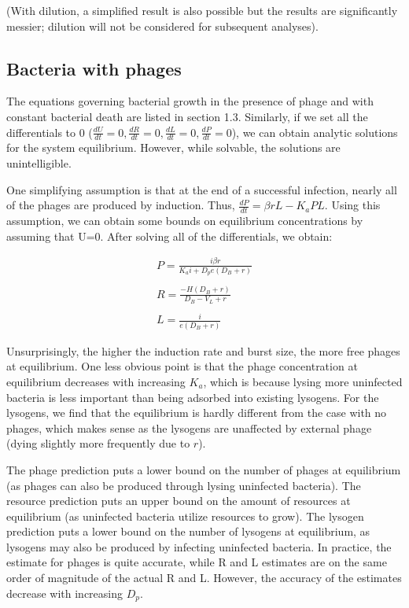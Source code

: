 \documentclass{article}
\begin{document}
(With dilution, a simplified result is also possible but the results are significantly messier; dilution will not be considered for subsequent analyses). 

\subsection{Bacteria with phages}
The equations governing bacterial growth in the presence of phage and with constant bacterial death are listed in section 1.3. Similarly, if we set all the differentials to 0 ($
\frac{dU}{dt} = 0, \frac{dR}{dt} = 0, \frac{dL}{dt} = 0, \frac{dP}{dt} = 0
$), we can obtain analytic solutions for the system equilibrium. However, while solvable, the solutions are unintelligible.  

One simplifying assumption is that at the end of a successful infection, nearly all of the phages are produced by induction. Thus, $\frac{dP}{dt} = \beta r L - K_a P L$. Using this assumption, we can obtain some bounds on equilibrium concentrations by assuming that U=0. After solving all of the differentials, we obtain:

\begin{equation}
\begin{split}
P = \frac{i \beta r }{K_a i + D_p e (D_B+r)} \\ \\
R = \frac{-H (D_B + r)}{D_B - V_L + r} \\ \\
L = \frac{i}{e (D_B + r)}
\end{split}
\end{equation}

Unsurprisingly, the higher the induction rate and burst size, the more free phages at equilibrium. One less obvious point is that the phage concentration at equilibrium decreases with increasing $K_a$, which is because lysing more uninfected bacteria is less important than being adsorbed into existing lysogens. For the lysogens, we find that the equilibrium is hardly different from the case with no phages, which makes sense as the lysogens are unaffected by external phage (dying slightly more frequently due to $r$).

The phage prediction puts a lower bound on the number of phages at equilibrium (as phages can also be produced through lysing uninfected bacteria). The resource prediction puts an upper bound on the amount of resources at equilibrium (as uninfected bacteria utilize resources to grow). The lysogen prediction puts a lower bound on the number of lysogens at equilibrium, as lysogens may also be produced by infecting uninfected bacteria. In practice, the estimate for phages is quite accurate, while R and L estimates are on the same order of magnitude of the actual R and L. However, the accuracy of the estimates decrease with increasing $D_p$.
\end{document}
